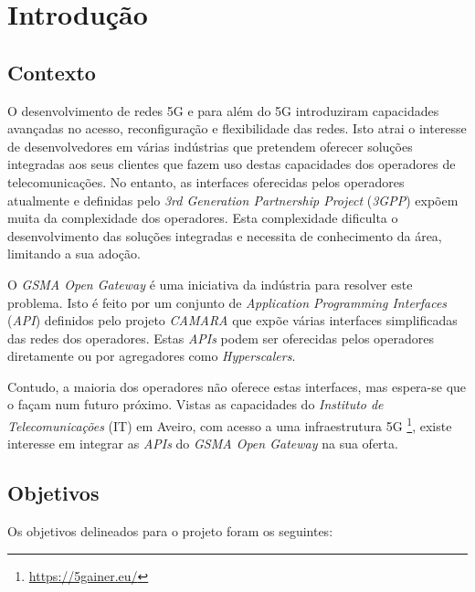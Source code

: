 \chapter{Introdução}

\section{Contexto}

O desenvolvimento de redes 5G e para além do 5G introduziram capacidades
avançadas no acesso, reconfiguração e flexibilidade das redes. Isto atrai o
interesse de desenvolvedores em várias indústrias que pretendem oferecer
soluções integradas aos seus clientes que fazem uso destas capacidades dos
operadores de telecomunicações. No entanto, as interfaces oferecidas pelos
operadores atualmente e definidas pelo \emph{3rd Generation Partnership
	Project} (\emph{3GPP}) expõem muita da complexidade dos operadores. Esta complexidade
dificulta o desenvolvimento das soluções integradas e necessita de conhecimento
da área, limitando a sua adoção.

O \emph{GSMA Open Gateway} é uma iniciativa da indústria para resolver este
problema. Isto é feito por um conjunto de \emph{Application Programming
	Interfaces} (\emph{API}) definidos pelo projeto \emph{CAMARA} que expõe várias
interfaces simplificadas das redes dos operadores. Estas \emph{APIs} podem ser
oferecidas pelos operadores diretamente ou por agregadores como
\emph{Hyperscalers}.

Contudo, a maioria dos operadores não oferece estas interfaces, mas espera-se
que o façam num futuro próximo. Vistas as capacidades do \emph{Instituto de
	Telecomunicações} (IT) em Aveiro, com acesso a uma infraestrutura 5G
\footnote{\url{https://5gainer.eu/}}\cite{ieee:5GAIner}, existe interesse em
integrar as \emph{APIs} do \emph{GSMA Open Gateway} na sua oferta.

\section{Objetivos}

Os objetivos delineados para o projeto foram os seguintes:

